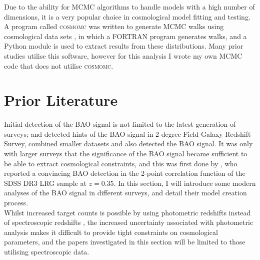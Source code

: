 \documentclass[titlesmallcaps, examinerscopy, copyrightpage]{uqthesis}
\begin{document}
Due to the ability for MCMC algorithms to handle models with a high number of dimensions, it is a very popular choice in cosmological model fitting and testing. A program called \textsc{cosmomc} was written to generate MCMC walks using cosmological data sets \citep{LewisBridle2002}, in which a FORTRAN program generates walks, and a Python module is used to extract results from these distributions. Many prior studies utilise this software, however for this analysis I wrote my own MCMC code that does not utilise \textsc{cosmomc}.

\chapter{Prior Literature}


Initial detection of the BAO signal is not limited to the latest generation of surveys;
\cite{ColePercival2005} and \citet{PercivalBaugh2001} detected hints of the BAO signal in 2-degree Field Galaxy Redshift Survey,  \citet{MillerNichol2001} combined smaller datasets and also detected the BAO signal. It was only with larger surveys that the significance of the BAO signal became sufficient to be able to extract cosmological constraints, and this was first done by \citet{EisensteinZehavi2005}, who reported a convincing BAO detection in the 2-point correlation function of the SDSS \citep[SDSS]{YorkAdelmanAnderson2000} DR3 LRG sample at $z = 0.35$. In this section, I will introduce some modern analyses of the BAO signal in different surveys, and detail their model creation process.\\

Whilst increased target counts is possible by using photometric redshifts instead of spectroscopic redshifts \citep[see][for analysis of the BAO signal from the SDSS Luminous Red Galaxies (LRGs) catalogue]{BlakeCollister2007,Padmanabhan2007,HoCuesta2012}, the increased uncertainty associated with photometric analysis makes it difficult to provide tight constraints on cosmological parameters, and the papers investigated in this section will be limited to those utilising spectroscopic data.\\
\end{document}
